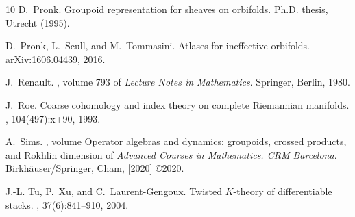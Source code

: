 \documentclass[a4paper]{amsart}
\newcommand\<{\langle}
\renewcommand\>{\rangle}
\theoremstyle{definition}
\theoremstyle{remark}
\begin{document}
\begin{thebibliography}{10}
D.~Pronk.
\newblock Groupoid representation for sheaves on orbifolds.
\newblock Ph.D. thesis, Utrecht (1995).

D.~Pronk, L.~Scull, and M.~Tommasini.
\newblock Atlases for ineffective orbifolds.
\newblock arXiv:1606.04439, 2016.

J.~Renault.
, volume 793 of
  {\em Lecture Notes in Mathematics}.
\newblock Springer, Berlin, 1980.

J.~Roe.
\newblock Coarse cohomology and index theory on complete {R}iemannian
  manifolds.
, 104(497):x+90, 1993.

A.~Sims.
, volume
  Operator algebras and dynamics: groupoids, crossed products, and {R}okhlin
  dimension of {\em Advanced Courses in Mathematics. CRM Barcelona}.
\newblock Birkh\"auser/Springer, Cham, [2020] \copyright 2020.

J.-L. Tu, P.~Xu, and C.~Laurent-Gengoux.
\newblock Twisted {$K$}-theory of differentiable stacks.
, 37(6):841--910, 2004.

\end{thebibliography}
\end{document}
